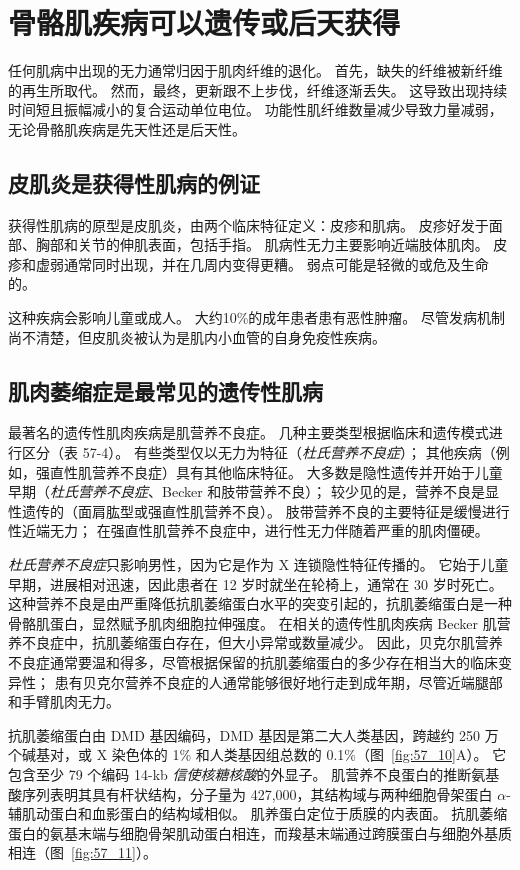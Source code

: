 \section{骨骼肌疾病可以遗传或后天获得}

任何肌病中出现的无力通常归因于肌肉纤维的退化。
首先，缺失的纤维被新纤维的再生所取代。
然而，最终，更新跟不上步伐，纤维逐渐丢失。
这导致出现持续时间短且振幅减小的复合运动单位电位。
功能性肌纤维数量减少导致力量减弱，无论骨骼肌疾病是先天性还是后天性。



\subsection{皮肌炎是获得性肌病的例证}

获得性肌病的原型是皮肌炎，由两个临床特征定义：皮疹和肌病。
皮疹好发于面部、胸部和关节的伸肌表面，包括手指。
肌病性无力主要影响近端肢体肌肉。
皮疹和虚弱通常同时出现，并在几周内变得更糟。
弱点可能是轻微的或危及生命的。


这种疾病会影响儿童或成人。
大约10\%的成年患者患有恶性肿瘤。
尽管发病机制尚不清楚，但皮肌炎被认为是肌内小血管的自身免疫性疾病。



\subsection{肌肉萎缩症是最常见的遗传性肌病}

最著名的遗传性肌肉疾病是肌营养不良症。
几种主要类型根据临床和遗传模式进行区分（表 57-4）。
有些类型仅以无力为特征（\textit{杜氏营养不良症}）；
其他疾病（例如，强直性肌营养不良症）具有其他临床特征。 大多数是隐性遗传并开始于儿童早期（\textit{杜氏营养不良症}、Becker 和肢带营养不良）；
较少见的是，营养不良是显性遗传的（面肩肱型或强直性肌营养不良）。
肢带营养不良的主要特征是缓慢进行性近端无力；
在强直性肌营养不良症中，进行性无力伴随着严重的肌肉僵硬。


\textit{杜氏营养不良症}只影响男性，因为它是作为 X 连锁隐性特征传播的。
它始于儿童早期，进展相对迅速，因此患者在 12 岁时就坐在轮椅上，通常在 30 岁时死亡。
这种营养不良是由严重降低抗肌萎缩蛋白水平的突变引起的，抗肌萎缩蛋白是一种骨骼肌蛋白，显然赋予肌肉细胞拉伸强度。
在相关的遗传性肌肉疾病 Becker 肌营养不良症中，抗肌萎缩蛋白存在，但大小异常或数量减少。
因此，贝克尔肌营养不良症通常要温和得多，尽管根据保留的抗肌萎缩蛋白的多少存在相当大的临床变异性；
患有贝克尔营养不良症的人通常能够很好地行走到成年期，尽管近端腿部和手臂肌肉无力。


抗肌萎缩蛋白由 DMD 基因编码，DMD 基因是第二大人类基因，跨越约 250 万个碱基对，或 X 染色体的 1\% 和人类基因组总数的 0.1\%（图~\ref{fig:57_10}A）。
它包含至少 79 个编码 14-kb \textit{信使核糖核酸}的外显子。
肌营养不良蛋白的推断氨基酸序列表明其具有杆状结构，分子量为 427,000，其结构域与两种细胞骨架蛋白 $ \alpha $-辅肌动蛋白和血影蛋白的结构域相似。
肌养蛋白定位于质膜的内表面。
抗肌萎缩蛋白的氨基末端与细胞骨架肌动蛋白相连，而羧基末端通过跨膜蛋白与细胞外基质相连（图~\ref{fig:57_11}）。


